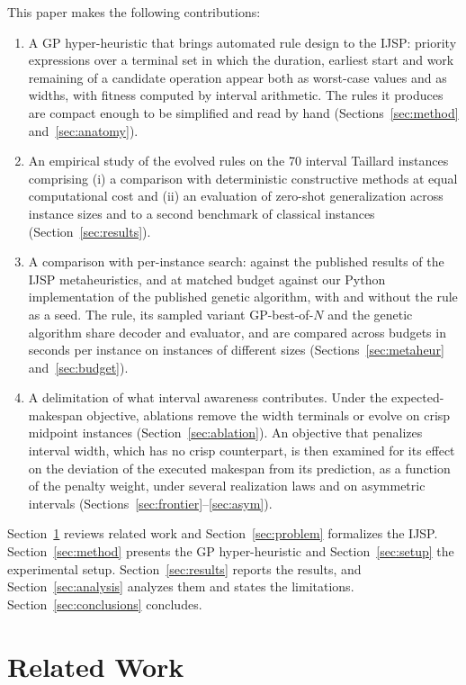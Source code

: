 \documentclass[review,authoryear,11pt]{elsarticle}
\begin{document}
This paper makes the following contributions:
\begin{enumerate}
\item A GP hyper-heuristic that brings automated rule design to the
  IJSP: priority expressions over a terminal set in which the duration,
  earliest start and work remaining of a candidate operation appear
  both as worst-case values and as widths, with fitness computed by
  interval arithmetic. The rules it produces are compact enough to be
  simplified and read by hand (Sections~\ref{sec:method}
  and~\ref{sec:anatomy}).
\item An empirical study of the evolved rules on the 70 interval
  Taillard instances comprising (i) a comparison with deterministic
  constructive methods at equal computational cost and (ii) an
  evaluation of zero-shot generalization across instance sizes and to
  a second benchmark of classical instances
  (Section~\ref{sec:results}).
\item A comparison with per-instance search: against the published
  results of the IJSP metaheuristics, and at matched budget against our
  Python implementation of the published genetic algorithm, with and
  without the rule as a seed. The rule, its sampled variant
  GP-best-of-$N$ and the genetic algorithm share decoder and evaluator,
  and are compared across budgets in seconds per instance on instances
  of different sizes (Sections~\ref{sec:metaheur} and~\ref{sec:budget}).
\item A delimitation of what interval awareness contributes. Under the
  expected-makespan objective, ablations remove the width terminals or
  evolve on crisp midpoint instances (Section~\ref{sec:ablation}). An
  objective that penalizes interval width, which has no crisp
  counterpart, is then examined for its effect on the deviation of the
  executed makespan from its prediction, as a function of the penalty
  weight, under several realization laws and on asymmetric intervals
  (Sections~\ref{sec:frontier}--\ref{sec:asym}).
\end{enumerate}

Section~\ref{sec:related} reviews related work and
Section~\ref{sec:problem} formalizes the IJSP. Section~\ref{sec:method}
presents the GP hyper-heuristic and Section~\ref{sec:setup} the
experimental setup. Section~\ref{sec:results} reports the results, and
Section~\ref{sec:analysis} analyzes them and states the limitations.
Section~\ref{sec:conclusions} concludes.

\section{Related Work}
\label{sec:related}
\end{document}
